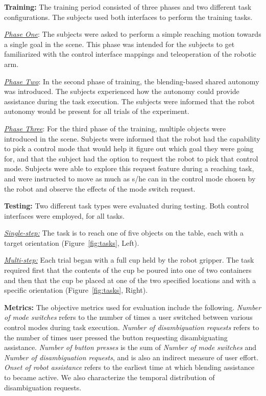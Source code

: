 \noindent\textbf{Training:} The training period consisted of three phases and two different task configurations. The subjects used both interfaces to perform the training tasks.

\noindent\underline{\textit{Phase One}}: The subjects were asked to perform a simple reaching motion towards a single goal in the scene. This phase was intended for the subjects to get familiarized with the control interface mappings and teleoperation of the robotic arm. 

\noindent\underline{\textit{Phase Two}}: In the second phase of training, the blending-based shared autonomy was introduced. The subjects experienced how the autonomy could provide assistance during the task execution. The subjects were informed that the robot autonomy would be present for all trials of the experiment. 

\noindent\underline{\textit{Phase Three}}: For the third phase of the training, multiple objects were introduced in the scene. 
Subjects were informed that the robot had the capability to pick a control mode that would help it figure out which goal they were going for, and that the subject had the option to request the robot to pick that control mode. 
Subjects were able to explore this request feature during a reaching task, and were instructed to move as much as s/he can in the control mode chosen by the robot and observe the effects of the mode switch request. 

\noindent\textbf{Testing:} Two different task types were evaluated during testing. Both control interfaces were employed, for all tasks.

\noindent\underline{\textit{Single-step:}} The task is to reach one of five objects on the table, each with a target orientation (Figure~\ref{fig:tasks}, Left). 

\noindent\underline{\textit{Multi-step:}} Each trial began with a full cup held by the robot gripper. The task required first that the contents of the cup be poured into one of two containers and then that the cup be placed at one of the two specified locations and with a specific orientation (Figure~\ref{fig:tasks}, Right). 


\noindent\textbf{Metrics:}
The objective metrics used for evaluation include the following. \textit{Number of mode switches} refers to the number of times a user switched between various control modes during task execution. \textit{Number of disambiguation requests} refers to the number of times user pressed the button requesting disambiguating assistance. \textit{Number of button presses} is the sum of \textit{Number of mode switches} and \textit{Number of disambiguation requests}, and is also an indirect measure of user effort. \textit{Onset of robot assistance} refers to the earliest time at which blending assistance to became active. We also characterize the temporal distribution of disambiguation requests.


